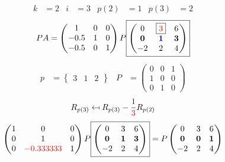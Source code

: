 \documentclass[pdf]{beamer}
\begin{document}
\begin{frame}{}\begin{align*} k &= 2 & i &= 3 & p(2) &= 1 & p(3) &= 2\end{align*} $$PA=\begin{pmatrix}1&0&0\\-0.5&1&0\\-0.5&0&1\end{pmatrix} P \boxed{\begin{pmatrix}0&\boxed{{\color{red}3}}&6\\\mathbf{0}&\mathbf{{\color{blue}1}}&\mathbf{3}\\-2&2&4\end{pmatrix}} $$ \begin{align*} p&= \begin{Bmatrix}3&1&2\end{Bmatrix} & P&= \begin{pmatrix}0&0&1\\1&0&0\\0&1&0\end{pmatrix} \end{align*} $$R_{p(3)} \mapsfrom R_{p(3)} - \frac{{\color{blue}1}}{{\color{red}3}} R_{p(2)}$$ $$ \begin{pmatrix}1&0&0\\0&1&0\\0&{\color{red}-0.333333}&1\end{pmatrix} P \boxed{\begin{pmatrix}0&3&6\\\mathbf{0}&\mathbf{1}&\mathbf{3}\\-2&2&4\end{pmatrix}} = P \begin{pmatrix}0&3&6\\\mathbf{0}&\mathbf{0}&\mathbf{1}\\-2&2&4\end{pmatrix} $$\end{frame}
\end{document}
